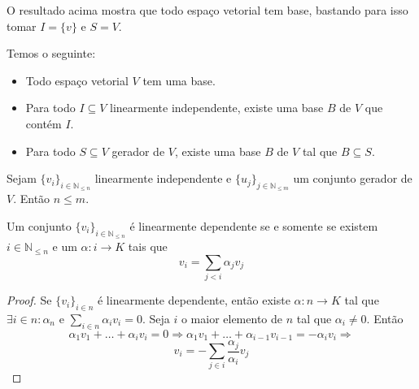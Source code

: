 \documentclass[11pt,twoside,a4paper]{book}
\begin{document}
O resultado acima mostra que todo espaço vetorial tem base, bastando para isso tomar $I = \{ v \}$ e $S = V.$
\begin{corolario}
Temos o seguinte:
\begin{itemize}
\item Todo espaço vetorial $V$ tem uma base.
\item Para todo $I\subseteq V$ linearmente independente, existe uma base $B$ de $V$ que contém $I$.
\item Para todo $S\subseteq V$ gerador de $V$, existe uma base $B$ de $V$ tal que $B\subseteq S$.
\end{itemize}
\end{corolario}


\begin{lema}
Sejam $\{v_i\}_{i \in \mathbb{N}_{\le n}}$ linearmente independente e $\{u_j\}_{j\in \mathbb{N}_{\le m}}$ um conjunto gerador de $V$. Então $n\leq m$.
\end{lema}

\begin{sublema}
Um conjunto $\{v_i\}_{i \in \mathbb{N}_{\le n}}$ é linearmente dependente se e somente se existem $i\in  \mathbb{N}_{\le n}$ e um $\alpha: i\rightarrow K$ tais que \[v_i=\sum\limits_{j <i}\alpha_jv_j\]
\begin{proof}
Se $\{v_i\}_{i\in n}$ é linearmente dependente, então existe $\alpha:n\rightarrow K$ tal que $\exists i\in n:\alpha_n$ e $\sum_{i\in n}\alpha_iv_i=0$. Seja $i$ o maior elemento de $n$ tal que $\alpha_i\neq 0$. Então 
\[
\alpha_1 v_1 + \ldots + \alpha_i v_i = 0 \Rightarrow \alpha_1v_1 + \ldots + \alpha_{i-1} v_{i-1} = - \alpha_i v_i \Rightarrow
\]
\[v_i= - \sum\limits_{j\in i}\frac{\alpha_j}{\alpha_i}v_j\]
\end{proof}
\end{sublema}
\end{document}
